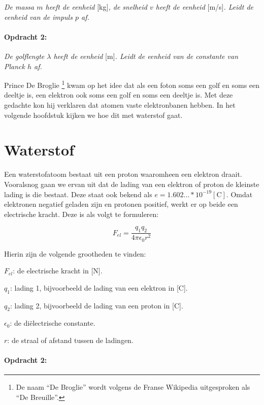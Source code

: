 \emph{De massa $m$ heeft de eenheid }{[}kg{]}\emph{, de snelheid
$v$ heeft de eenheid }{[}m/s{]}\emph{. Leidt de eenheid van de impuls
$p$ af.}


\paragraph*{Opdracht 2:}

\emph{De golflengte $\lambda$ heeft de eenheid }{[}m{]}\emph{. Leidt
de eenheid van de constante van Planck $h$ af.}

Prince De Broglie \footnote{De naam ``De Broglie'' wordt volgens de
Franse Wikipedia uitgesproken als ``De Breuille''.} kwam op het idee dat
als een foton soms een golf en soms een deeltje is, een elektron ook
soms een golf en soms een deeltje is. Met deze gedachte kon hij
verklaren dat atomen vaste elektronbanen hebben. In het volgende
hoofdstuk kijken we hoe dit met waterstof gaat.


\section{Waterstof}

Een waterstofatoom bestaat uit een proton waaromheen een elektron
draait. Vooralsnog gaan we ervan uit dat de lading van een elektron
of proton de kleinste lading is die bestaat. Deze staat ook bekend
als $e=1.602...*10^{-19}[\mathrm{C}]$. Omdat elektronen negatief
geladen zijn en protonen positief, werkt er op beide een electrische
kracht. Deze is als volgt te formuleren: 

\begin{equation} \label{eq:kracht_water}
F_{el}=\frac{q_{1}q_{2}}{4\pi\epsilon_{0}r^{2}}
\end{equation}


Hierin zijn de volgende grootheden te vinden:

$F_{el}$: de electrische kracht in {[}N{]}.

$q_{1}$: lading 1, bijvoorbeeld de lading van een elektron in {[}C{]}.

$q_{2}$: lading 2, bijvoorbeeld de lading van een proton in {[}C{]}.

$\epsilon_{0}$: de diëlectrische constante.

$r$: de straal of afstand tussen de ladingen.


\paragraph*{Opdracht 2:}

